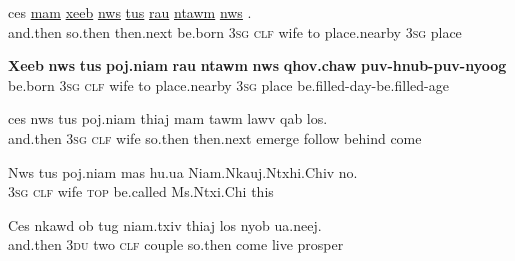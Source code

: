 \documentclass[output=paper]{LSP/langsci}
\begin{document}
\begin{exe}
 \label{JaexApp11}
\gll ces \underline{}  \underline{mam} \underline{xeeb} \underline{nws} \underline{tus}  \underline{} \underline{rau} \underline{ntawm} \underline{nws}  \underline{}.\\
     and.then so.then  then.next be.born 3\textsc{sg} \textsc{clf} wife to place.nearby 3\textsc{sg} place\\
\glt  {}
\end{exe}
 
\begin{exe}
 \label{JaexApp12}
\gll \textbf{Xeeb} \textbf{nws} \textbf{tus} \textbf{poj.niam} \textbf{rau} \textbf{ntawm} \textbf{nws} \textbf{qhov.chaw} \textbf{puv-hnub-puv-nyoog}\\
     be.born 3\textsc{sg} \textsc{clf} wife to place.nearby 3\textsc{sg} place be.filled-day-be.filled-age\\
\glt {}
\end{exe}

\begin{exe}
 \label{JaexApp13}
\gll ces nws tus poj.niam thiaj mam tawm lawv qab los.\\
and.then 3\textsc{sg} \textsc{clf} wife so.then then.next emerge follow behind come\\
\glt {}
\end{exe}

\begin{exe}
 \label{JaexApp14}
\gll Nws tus poj.niam mas hu.ua Niam.Nkauj.Ntxhi.Chiv no.\\
     \textsc{3sg} \textsc{clf} wife \textsc{top} be.called Ms.Ntxi.Chi this\\
\glt {}
\end{exe}

\begin{exe}
 \label{JaexApp15}
\gll Ces nkawd ob tug niam.txiv thiaj los nyob ua.neej.\\
     and.then 3\textsc{du} two \textsc{clf} couple so.then come live prosper\\
\glt {}
\end{exe}
\end{document}
